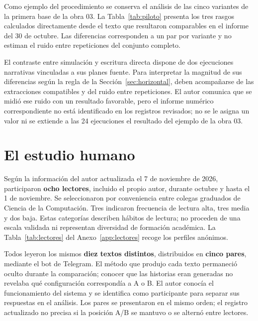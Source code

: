 Como ejemplo del procedimiento se conserva el análisis de las cinco variantes de la primera base
de la obra 03. La Tabla~\ref{tab:piloto} presenta los tres rasgos calculados directamente desde el
texto que resultaron comparables en el informe del 30 de octubre. Las diferencias corresponden a un
par por variante y no estiman el ruido entre repeticiones del conjunto completo.

\begin{table}[htb]
  \centering
  \caption{Diferencias con la base de la obra 03 (un par por variante, 2026-10-30)}
  \label{tab:piloto}
  \footnotesize
  \setlength{\tabcolsep}{4pt}
  
\end{table}

El contraste entre simulación y escritura directa dispone de dos ejecuciones narrativas vinculadas
a sus planes fuente. Para interpretar la magnitud de sus diferencias según la regla de la
Sección~\ref{sec:horizontal}, deben acompañarse de las extracciones compatibles y del ruido entre
repeticiones. El autor comunica que se midió ese ruido con un resultado favorable, pero el informe
numérico correspondiente no está identificado en los registros revisados; no se le asigna un valor
ni se extiende a las 24 ejecuciones el resultado del ejemplo de la obra 03.

\section{El estudio humano}\label{sec:resultados-estudio}

Según la información del autor actualizada el 7 de noviembre de 2026, participaron
\textbf{ocho lectores}, incluido el propio autor, durante octubre y hasta el 1 de noviembre.
Se seleccionaron por conveniencia entre colegas graduados de Ciencia de la Computación. Tres
indicaron frecuencia de lectura alta, tres media y dos baja. Estas categorías describen hábitos
de lectura; no proceden de una escala validada ni representan diversidad de formación académica.
La Tabla~\ref{tab:lectores} del Anexo~\ref{app:lectores} recoge los perfiles anónimos.

Todos leyeron los mismos \textbf{diez textos distintos}, distribuidos en \textbf{cinco pares},
mediante el bot de Telegram. El método que produjo cada texto permaneció oculto durante la
comparación; conocer que las historias eran generadas no revelaba qué configuración correspondía
a A o B. El autor conocía el funcionamiento del sistema y se identifica como participante para
separar sus respuestas en el análisis. Los pares se presentaron en el mismo orden; el registro
actualizado no precisa si la posición A/B se mantuvo o se alternó entre lectores.

